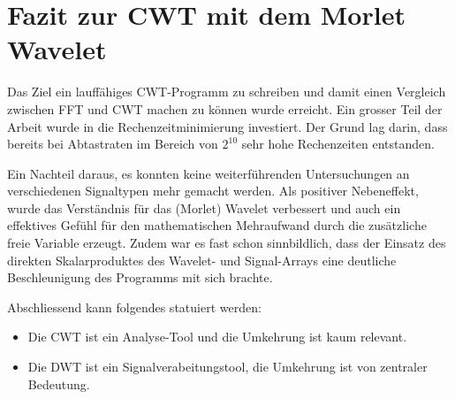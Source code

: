 %
%
%
%
\section{Fazit zur CWT mit dem Morlet Wavelet
	\label{wavelets:section:teil6}}

Das Ziel ein lauffähiges CWT-Programm zu schreiben und damit einen Vergleich zwischen FFT und CWT machen zu können wurde erreicht. Ein grosser Teil der Arbeit wurde in die Rechenzeitminimierung investiert. Der Grund lag darin, dass bereits bei Abtastraten im Bereich von $2^{10}$ sehr hohe Rechenzeiten entstanden.

Ein Nachteil daraus, es konnten keine weiterführenden Untersuchungen an verschiedenen Signaltypen mehr gemacht werden. Als positiver Nebeneffekt, wurde das Verständnis für das (Morlet) Wavelet verbessert und auch ein effektives Gefühl für den mathematischen Mehraufwand durch die zusätzliche freie Variable erzeugt. Zudem war es fast schon sinnbildlich, dass der Einsatz des direkten Skalarproduktes des Wavelet- und Signal-Arrays eine deutliche Beschleunigung des Programms mit sich brachte. 


Abschliessend kann folgendes statuiert werden:

\begin{itemize}
		\item Die CWT ist ein Analyse-Tool und die Umkehrung ist kaum relevant.
		\item Die DWT ist ein Signalverabeitungstool, die Umkehrung ist von zentraler Bedeutung.
\end{itemize}